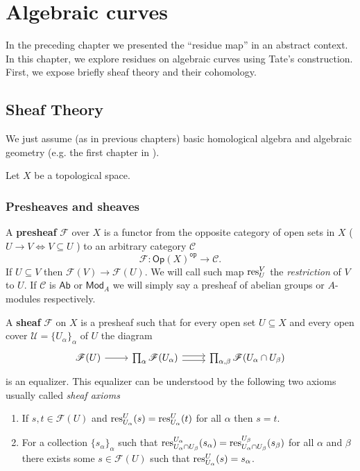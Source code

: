 \chapter{Algebraic curves}\label{ch:algebraic-curves}
In the preceding chapter we presented the ``residue map'' in an abstract context. In this chapter, we explore residues on algebraic curves using Tate's construction. First, we expose briefly sheaf theory and their cohomology.
\section{Sheaf Theory} 
We just assume (as in previous chapters) basic homological algebra and algebraic geometry (e.g. the first chapter in \cite{hartshorne}).

Let $X$ be a topological space.
\subsection{Presheaves and sheaves}
\begin{definition}\label{def:presheaf}
	A \textbf{presheaf} $\mathscr F$ over $X$ is a functor from the opposite category of open sets in $X$ ($U \to V \iff V\subseteq U$ ) to an arbitrary category $\mathcal{C}$ 
	\[
		\mathscr F\colon \mathsf{Op}(X)^{\mathtt{op}} \to \mathcal{C}.
	\]
	If $U \subseteq V$ then $\mathscr{F}(V) \to \mathscr{F}(U)$. We will call such map $\operatorname{res}^{V}_{U}$ the \textit{restriction} of $V$ to $U$. If $\mathcal{C}$ is $\mathsf{Ab}$ or $\mathsf{Mod}_{A}$ we will simply say a presheaf of abelian groups or $A$-modules respectively.
\end{definition}
\begin{definition}\label{def:sheaf}
	A \textbf{sheaf} $\mathscr F$ on $X$ is a presheaf such that for every open set $U \subseteq X$ and every open cover $\mathscr U = \{U_{\alpha}\}_{\alpha}$ of $U$ the diagram
	\[
		\begin{tikzcd}
			\mathscr{F}(U)\arrow[r] & \prod_{\alpha}\mathscr{F}(U_{\alpha}) \arrow[r, shift right] \arrow[r, shift left] & \prod_{\alpha, \beta} \mathscr{F}(U_{\alpha} \cap U_{\beta})
		\end{tikzcd}
	\]
	is an equalizer. This equalizer can be understood by the following two axioms usually called \textit{sheaf axioms}
	\begin{enumerate}[label = (\roman*)]
		\item If $s,t \in \mathscr{F}(U)$ and $\operatorname{res}^{U}_{U_{\alpha}}(s) = \operatorname{res}^{U}_{U_{\alpha}}(t)$ for all $\alpha$ then $s = t$.
		\item For a collection $\{s_{\alpha}\}_{\alpha}$ such that $\operatorname{res}^{U_{\alpha}}_{U_{\alpha}\cap U_{\beta}}(s_{\alpha}) = \operatorname{res}^{U_{\beta}}_{U_{\alpha}\cap U_{\beta}}(s_{\beta})$ for all $\alpha$ and $\beta$ there exists some $s \in \mathscr{F}(U)$ such that $\operatorname{res}^{U}_{U_{\alpha}}(s) = s_{\alpha}$.
	\end{enumerate}
\end{definition}

